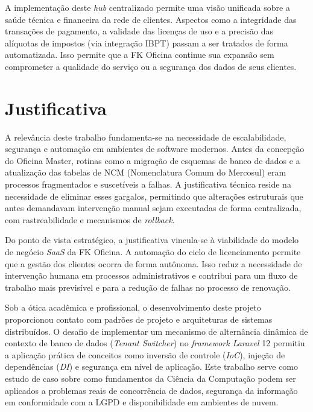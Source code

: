 A implementação deste \textit{hub} centralizado permite uma visão unificada sobre a saúde técnica e financeira da rede de clientes. Aspectos como a integridade das transações de pagamento, a validade das licenças de uso e a precisão das alíquotas de impostos (via integração IBPT) passam a ser tratados de forma automatizada. Isso permite que a FK Oficina continue sua expansão sem comprometer a qualidade do serviço ou a segurança dos dados de seus clientes.

\section{Justificativa}
\label{sec:justificativa}

A relevância deste trabalho fundamenta-se na necessidade de escalabilidade, segurança e automação em ambientes de software modernos. Antes da concepção do Oficina Master, rotinas como a migração de esquemas de banco de dados e a atualização das tabelas de NCM (Nomenclatura Comum do Mercosul) eram processos fragmentados e suscetíveis a falhas. A justificativa técnica reside na necessidade de eliminar esses gargalos, permitindo que alterações estruturais que antes demandavam intervenção manual sejam executadas de forma centralizada, com rastreabilidade e mecanismos de \textit{rollback}.

Do ponto de vista estratégico, a justificativa vincula-se à viabilidade do modelo de negócio \textit{SaaS} da FK Oficina. A automação do ciclo de licenciamento permite que a gestão dos clientes ocorra de forma autônoma. Isso reduz a necessidade de intervenção humana em processos administrativos e contribui para um fluxo de trabalho mais previsível e para a redução de falhas no processo de renovação.

Sob a ótica acadêmica e profissional, o desenvolvimento deste projeto proporcionou contato com padrões de projeto e arquiteturas de sistemas distribuídos. O desafio de implementar um mecanismo de alternância dinâmica de contexto de banco de dados (\textit{Tenant Switcher}) no \textit{framework Laravel} 12 permitiu a aplicação prática de conceitos como inversão de controle (\textit{IoC}), injeção de dependências (\textit{DI}) e segurança em nível de aplicação. Este trabalho serve como estudo de caso sobre como fundamentos da Ciência da Computação podem ser aplicados a problemas reais de concorrência de dados, segurança da informação em conformidade com a LGPD e disponibilidade em ambientes de nuvem.

